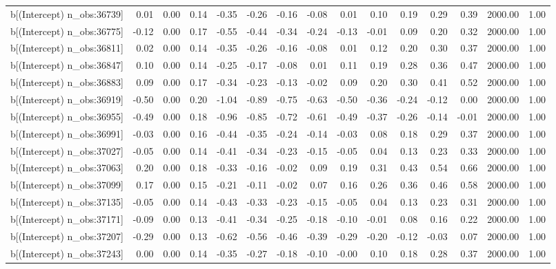\begin{table}[ht]
\begin{tabular}{rrrrrrrrrrrrrrr}
  b[(Intercept) n\_obs:36739] & 0.01 & 0.00 & 0.14 & -0.35 & -0.26 & -0.16 & -0.08 & 0.01 & 0.10 & 0.19 & 0.29 & 0.39 & 2000.00 & 1.00 \\ 
  b[(Intercept) n\_obs:36775] & -0.12 & 0.00 & 0.17 & -0.55 & -0.44 & -0.34 & -0.24 & -0.13 & -0.01 & 0.09 & 0.20 & 0.32 & 2000.00 & 1.00 \\ 
  b[(Intercept) n\_obs:36811] & 0.02 & 0.00 & 0.14 & -0.35 & -0.26 & -0.16 & -0.08 & 0.01 & 0.12 & 0.20 & 0.30 & 0.37 & 2000.00 & 1.00 \\ 
  b[(Intercept) n\_obs:36847] & 0.10 & 0.00 & 0.14 & -0.25 & -0.17 & -0.08 & 0.01 & 0.11 & 0.19 & 0.28 & 0.36 & 0.47 & 2000.00 & 1.00 \\ 
  b[(Intercept) n\_obs:36883] & 0.09 & 0.00 & 0.17 & -0.34 & -0.23 & -0.13 & -0.02 & 0.09 & 0.20 & 0.30 & 0.41 & 0.52 & 2000.00 & 1.00 \\ 
  b[(Intercept) n\_obs:36919] & -0.50 & 0.00 & 0.20 & -1.04 & -0.89 & -0.75 & -0.63 & -0.50 & -0.36 & -0.24 & -0.12 & 0.00 & 2000.00 & 1.00 \\ 
  b[(Intercept) n\_obs:36955] & -0.49 & 0.00 & 0.18 & -0.96 & -0.85 & -0.72 & -0.61 & -0.49 & -0.37 & -0.26 & -0.14 & -0.01 & 2000.00 & 1.00 \\ 
  b[(Intercept) n\_obs:36991] & -0.03 & 0.00 & 0.16 & -0.44 & -0.35 & -0.24 & -0.14 & -0.03 & 0.08 & 0.18 & 0.29 & 0.37 & 2000.00 & 1.00 \\ 
  b[(Intercept) n\_obs:37027] & -0.05 & 0.00 & 0.14 & -0.41 & -0.34 & -0.23 & -0.15 & -0.05 & 0.04 & 0.13 & 0.23 & 0.33 & 2000.00 & 1.00 \\ 
  b[(Intercept) n\_obs:37063] & 0.20 & 0.00 & 0.18 & -0.33 & -0.16 & -0.02 & 0.09 & 0.19 & 0.31 & 0.43 & 0.54 & 0.66 & 2000.00 & 1.00 \\ 
  b[(Intercept) n\_obs:37099] & 0.17 & 0.00 & 0.15 & -0.21 & -0.11 & -0.02 & 0.07 & 0.16 & 0.26 & 0.36 & 0.46 & 0.58 & 2000.00 & 1.00 \\ 
  b[(Intercept) n\_obs:37135] & -0.05 & 0.00 & 0.14 & -0.43 & -0.33 & -0.23 & -0.15 & -0.05 & 0.04 & 0.13 & 0.23 & 0.31 & 2000.00 & 1.00 \\ 
  b[(Intercept) n\_obs:37171] & -0.09 & 0.00 & 0.13 & -0.41 & -0.34 & -0.25 & -0.18 & -0.10 & -0.01 & 0.08 & 0.16 & 0.22 & 2000.00 & 1.00 \\ 
  b[(Intercept) n\_obs:37207] & -0.29 & 0.00 & 0.13 & -0.62 & -0.56 & -0.46 & -0.39 & -0.29 & -0.20 & -0.12 & -0.03 & 0.07 & 2000.00 & 1.00 \\ 
  b[(Intercept) n\_obs:37243] & 0.00 & 0.00 & 0.14 & -0.35 & -0.27 & -0.18 & -0.10 & -0.00 & 0.10 & 0.18 & 0.28 & 0.37 & 2000.00 & 1.00 \\ 

\end{tabular}
\end{table}
